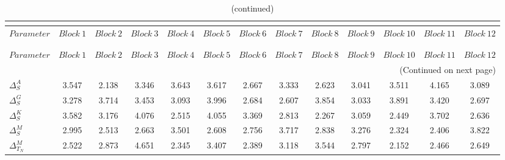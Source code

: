  
\begin{center}
\begin{longtable}{lcccccccccccc} 
\caption{MCMC Inefficiency factors per block}\\
 \label{Table:MCMC_inefficiency_factors}\\
\toprule 
$Parameter             $	 & 	 $     Block~1$	 & 	 $     Block~2$	 & 	 $     Block~3$	 & 	 $     Block~4$	 & 	 $     Block~5$	 & 	 $     Block~6$	 & 	 $     Block~7$	 & 	 $     Block~8$	 & 	 $     Block~9$	 & 	 $    Block~10$	 & 	 $    Block~11$	 & 	 $    Block~12$\\
\midrule \endfirsthead 
\caption{(continued)}\\
 \toprule \\ 
$Parameter             $	 & 	 $     Block~1$	 & 	 $     Block~2$	 & 	 $     Block~3$	 & 	 $     Block~4$	 & 	 $     Block~5$	 & 	 $     Block~6$	 & 	 $     Block~7$	 & 	 $     Block~8$	 & 	 $     Block~9$	 & 	 $    Block~10$	 & 	 $    Block~11$	 & 	 $    Block~12$\\
\midrule \endhead 
\midrule \multicolumn{13}{r}{(Continued on next page)} \\ \bottomrule \endfoot 
\bottomrule \endlastfoot 
$ {\Delta^{A}_{S}}     $	 & 	       3.547	 & 	       2.138	 & 	       3.346	 & 	       3.643	 & 	       3.617	 & 	       2.667	 & 	       3.333	 & 	       2.623	 & 	       3.041	 & 	       3.511	 & 	       4.165	 & 	       3.089 \\ 
$ {\Delta^{G}_{S}}     $	 & 	       3.278	 & 	       3.714	 & 	       3.453	 & 	       3.093	 & 	       3.996	 & 	       2.684	 & 	       2.607	 & 	       3.854	 & 	       3.033	 & 	       3.891	 & 	       3.420	 & 	       2.697 \\ 
$ {\Delta^{K}_{S}}     $	 & 	       3.582	 & 	       3.176	 & 	       4.076	 & 	       2.515	 & 	       4.055	 & 	       3.369	 & 	       2.813	 & 	       2.267	 & 	       3.059	 & 	       2.449	 & 	       3.702	 & 	       2.636 \\ 
$ {\Delta^{M}_{S}}     $	 & 	       2.995	 & 	       2.513	 & 	       2.663	 & 	       3.501	 & 	       2.608	 & 	       2.756	 & 	       3.717	 & 	       2.838	 & 	       3.276	 & 	       2.324	 & 	       2.406	 & 	       3.822 \\ 
$ {\Delta^{M}_{T_N}}   $	 & 	       2.522	 & 	       2.873	 & 	       4.651	 & 	       2.345	 & 	       3.407	 & 	       2.389	 & 	       3.118	 & 	       3.544	 & 	       2.797	 & 	       2.152	 & 	       2.466	 & 	       2.649 \\ 

\end{longtable}
\end{center}
